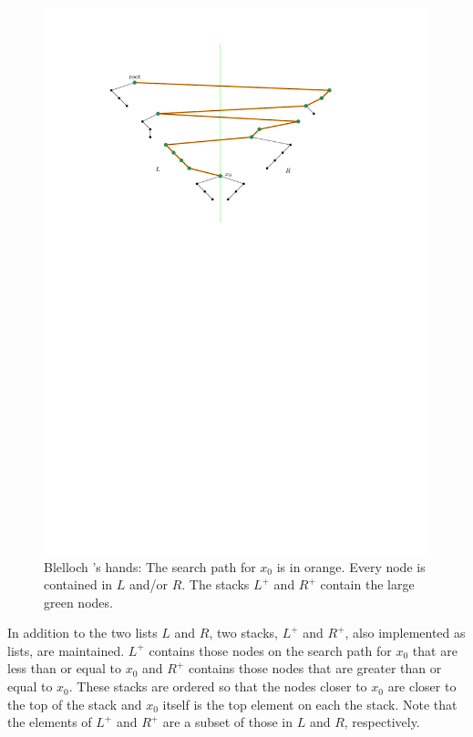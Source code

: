 \documentclass{patmorin}
\makeatletter
\def\ScaleIfNeeded{%
\ifdim\Gin@nat@width>.97\linewidth
.97\linewidth
\else
\Gin@nat@width
\fi
}
\makeatother
\begin{document}
\begin{figure}
  \begin{center}
    \includegraphics[width=\ScaleIfNeeded]{search-path}
  \end{center}
  \caption{Blelloch \etal's hands: The search path for $x_0$ is in orange. Every node is contained in $L$ and/or $R$.  The stacks $L^+$ and $R^+$ contain the large green nodes.}
\end{figure}

In addition to the two lists $L$ and $R$, two stacks, $L^+$ and $R^+$,
also implemented as lists, are maintained. $L^+$ contains those nodes
on the search path for $x_0$ that are less than or equal to $x_0$ and
$R^+$ contains those nodes that are greater than or equal to $x_0$.
These stacks are ordered so that the nodes closer to $x_0$ are closer
to the top of the stack and $x_0$ itself is the top element on each the
stack. Note that the elements of $L^+$ and $R^+$ are a subset of those
in $L$ and $R$, respectively.
\end{document}
